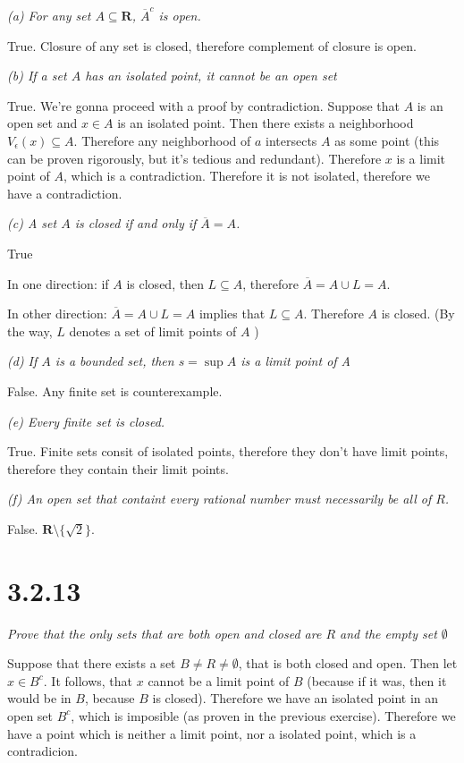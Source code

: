 \documentclass[11pt,oneside,titlepage]{book}
\begin{document}
\textit{(a) For any set $A \subseteq \textbf{R}$, $\overline A^c$ is open.}

True. Closure of any set is closed, therefore complement of closure is open.

\textit{(b) If a set $A$ has an isolated point, it cannot be an open set}

True. We're gonna proceed with a proof by contradiction.
Suppose that $A$ is an open set and $x \in A$ is an isolated point. Then there
exists a neighborhood $V_\epsilon(x) \subseteq A$. Therefore any neighborhood
of $a$ intersects $A$ as some point (this can be proven rigorously, but it's
tedious and redundant). Therefore $x$ is a limit point of $A$, which is a
contradiction. Therefore it is not isolated, therefore we have a contradiction.

\textit{(c) A set $A$ is closed if and only if $\overline A = A$.}

True

In one direction: if $A$ is closed, then $L \subseteq A$, therefore
$\overline A = A \cup L  = A$.

In other direction: $\overline A = A \cup L  = A$ implies that $L \subseteq A$.
Therefore $A$ is closed. (By the way, $L$ denotes a set of limit points of $A$ )

\textit{(d) If $A$ is a bounded set, then $s = \sup A$ is a limit point of A}

False. Any finite set is counterexample.

\textit{(e) Every finite set is closed.}

True. Finite sets consit of isolated points, therefore they don't have limit
points, therefore they contain their limit points.

\textit{(f) An open set that containt every rational number must necessarily be
  all of $R$.}

False. $\textbf{R} \setminus \{\sqrt{2}\}$.

\section*{3.2.13}
\textit{Prove that the only sets that are both open and closed are $R$ and
  the empty set $\emptyset$}

Suppose that there exists a set $B \neq R \neq \emptyset$, that is both
closed and open. Then let $x \in B^c$. It follows, that $x$ cannot be a limit
point of $B$ (because if it was, then it would be in $B$, because $B$ is closed).
Therefore we have an isolated point in an open set $B^c$, which is imposible
(as proven in the previous exercise). Therefore we have a point which is
neither a limit point, nor a isolated point, which is a contradicion.
\end{document}
